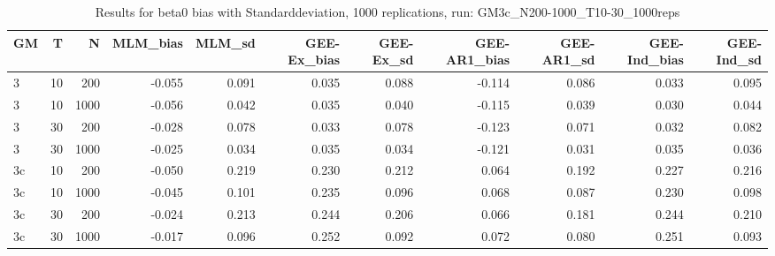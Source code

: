 \begin{table}[ht]
\centering
\begin{tabular}{lrrrrrrrrrr}
  \hline
GM & T & N & MLM\_bias & MLM\_sd & GEE-Ex\_bias & GEE-Ex\_sd & GEE-AR1\_bias & GEE-AR1\_sd & GEE-Ind\_bias & GEE-Ind\_sd \\ 
  \hline
3 & 10 & 200 & -0.055 & 0.091 & 0.035 & 0.088 & -0.114 & 0.086 & 0.033 & 0.095 \\ 
  3 & 10 & 1000 & -0.056 & 0.042 & 0.035 & 0.040 & -0.115 & 0.039 & 0.030 & 0.044 \\ 
  3 & 30 & 200 & -0.028 & 0.078 & 0.033 & 0.078 & -0.123 & 0.071 & 0.032 & 0.082 \\ 
  3 & 30 & 1000 & -0.025 & 0.034 & 0.035 & 0.034 & -0.121 & 0.031 & 0.035 & 0.036 \\ 
  3c & 10 & 200 & -0.050 & 0.219 & 0.230 & 0.212 & 0.064 & 0.192 & 0.227 & 0.216 \\ 
  3c & 10 & 1000 & -0.045 & 0.101 & 0.235 & 0.096 & 0.068 & 0.087 & 0.230 & 0.098 \\ 
   \hline
3c & 30 & 200 & -0.024 & 0.213 & 0.244 & 0.206 & 0.066 & 0.181 & 0.244 & 0.210 \\ 
  3c & 30 & 1000 & -0.017 & 0.096 & 0.252 & 0.092 & 0.072 & 0.080 & 0.251 & 0.093 \\ 
  \end{tabular}
\caption{Results for beta0 bias with Standarddeviation, 1000 replications, run: GM3c_N200-1000_T10-30_1000reps} 
\label{tab:beta0_bias_sd}
\end{table}
